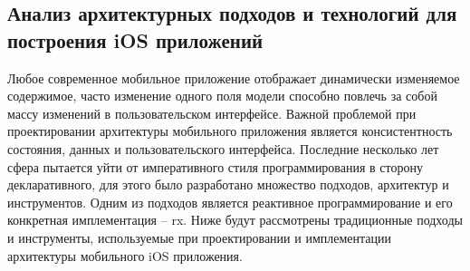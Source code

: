 \subsection{Анализ архитектурных подходов и технологий для построения iOS приложений}
\label{sec:analysis:research:mobArch}

Любое современное мобильное приложение отображает динамически изменяемое содержимое, часто изменение одного поля модели способно повлечь за собой массу изменений в пользовательском интерфейсе. Важной проблемой при проектировании архитектуры мобильного приложения является консистентность состояния, данных и пользовательского интерфейса. Последние несколько лет сфера пытается уйти от императивного стиля программирования в сторону декларативного, для этого было разработано множество подходов, архитектур и инструментов. Одним из подходов является реактивное программирование и его конкретная имплементация -- \gls{rx}. Ниже будут рассмотрены традиционные подходы и инструменты, используемые при проектировании и имплементации архитектуры мобильного iOS приложения.








